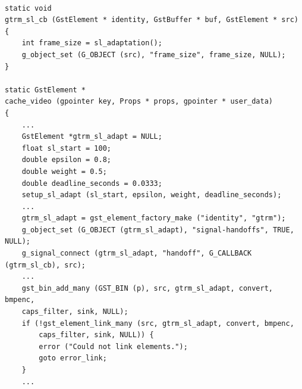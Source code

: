 \documentclass[nobiblatex]{LTHthesis}
\begin{document}
\begin{lstlisting}

static void
gtrm_sl_cb (GstElement * identity, GstBuffer * buf, GstElement * src)
{
	int frame_size = sl_adaptation();
	g_object_set (G_OBJECT (src), "frame_size", frame_size, NULL);
}

static GstElement *
cache_video (gpointer key, Props * props, gpointer * user_data)
{
	...
	GstElement *gtrm_sl_adapt = NULL;
	float sl_start = 100;
	double epsilon = 0.8;
	double weight = 0.5;
 	double deadline_seconds = 0.0333;
	setup_sl_adapt (sl_start, epsilon, weight, deadline_seconds);
	...
	gtrm_sl_adapt = gst_element_factory_make ("identity", "gtrm");
	g_object_set (G_OBJECT (gtrm_sl_adapt), "signal-handoffs", TRUE, NULL);
	g_signal_connect (gtrm_sl_adapt, "handoff", G_CALLBACK (gtrm_sl_cb), src);
	...
	gst_bin_add_many (GST_BIN (p), src, gtrm_sl_adapt, convert, bmpenc,
	caps_filter, sink, NULL);
	if (!gst_element_link_many (src, gtrm_sl_adapt, convert, bmpenc,
	    caps_filter, sink, NULL)) {
		error ("Could not link elements.");
		goto error_link;
	}
	...
\end{lstlisting}
\end{document}
